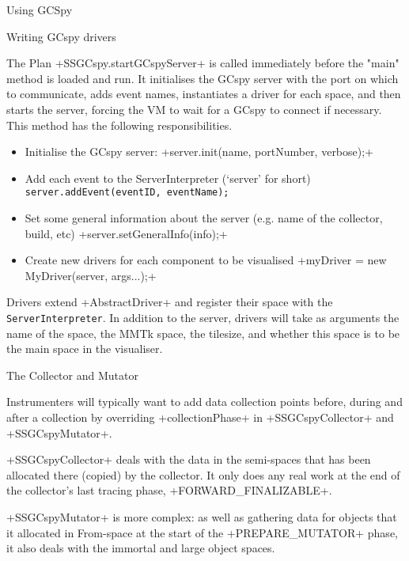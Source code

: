 \begin{section}{Using GCSpy}
\begin{subsection}{Writing GCspy drivers}
\begin{subsubsection}{The Plan}
\spverb+SSGCspy.startGCspyServer+ is called immediately before the "main" method is loaded and run. It initialises the GCspy server with the port on which to communicate, adds event names, instantiates a driver for each space, and then starts the server, forcing the VM to wait for a GCspy to connect if necessary. This method has the following responsibilities.
\begin{itemize}
  \item Initialise the GCspy server: \spverb+server.init(name, portNumber, verbose);+
  \item Add each event to the ServerInterpreter (`server' for short) \texttt{ser\-ver.add\-Event(event\-ID, event\-Name);}
  \item Set some general information about the server (e.g. name of the collector, build, etc) \spverb+server.setGeneralInfo(info);+
  \item Create new drivers for each component to be visualised \spverb+myDriver = new MyDriver(server, args...);+
\end{itemize}

Drivers extend \spverb+AbstractDriver+ and register their space with the \texttt{ServerInterpreter}. In addition to the server, drivers will take as arguments the name of the space, the MMTk space, the tilesize, and whether this space is to be the main space in the visualiser.

\end{subsubsection}

\begin{subsubsection}{The Collector and Mutator}

Instrumenters will typically want to add data collection points before, during and after a collection by overriding \spverb+collectionPhase+ in \spverb+SSGCspyCollector+ and \spverb+SSGCspyMutator+.

\spverb+SSGCspyCollector+ deals with the data in the semi-spaces that has been allocated there (copied) by the collector. It only does any real work at the end of the collector's last tracing phase, \spverb+FORWARD_FINALIZABLE+.

\spverb+SSGCspyMutator+ is more complex: as well as gathering data for objects that it allocated in From-space at the start of the \spverb+PREPARE_MUTATOR+ phase, it also deals with the immortal and large object spaces.


\end{subsubsection}
\end{subsection}
\end{section}
